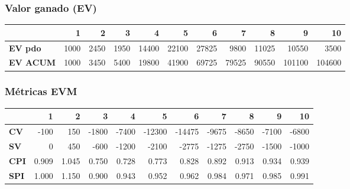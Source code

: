 \subsubsection*{Valor ganado (EV)}
\begin{table}[H]\centering\small
\begin{tabular}{lrrrrrrrrrr}
\toprule
 & \textbf{1} & \textbf{2} & \textbf{3} & \textbf{4} & \textbf{5} & \textbf{6} & \textbf{7} & \textbf{8} & \textbf{9} & \textbf{10} \\
\midrule
\textbf{EV pdo}  & 1000 & 2450 & 1950 & 14400 & 22100 & 27825 & 9800 & 11025 & 10550 & 3500 \\
\textbf{EV ACUM} & 1000 & 3450 & 5400 & 19800 & 41900 & 69725 & 79525 & 90550 & 101100 & 104600 \\
\bottomrule
\end{tabular}
\end{table}

\subsubsection*{Métricas EVM}
\begin{table}[H]\centering\small
\begin{tabular}{lrrrrrrrrrr}
\toprule
 & \textbf{1} & \textbf{2} & \textbf{3} & \textbf{4} & \textbf{5} & \textbf{6} & \textbf{7} & \textbf{8} & \textbf{9} & \textbf{10} \\
\midrule
\textbf{CV}  & -100 & 150 & -1800 & -7400 & -12300 & -14475 & -9675 & -8650 & -7100 & -6800 \\
\textbf{SV}  & 0 & 450 & -600 & -1200 & -2100 & -2775 & -1275 & -2750 & -1500 & -1000 \\
\textbf{CPI} & 0.909 & 1.045 & 0.750 & 0.728 & 0.773 & 0.828 & 0.892 & 0.913 & 0.934 & 0.939 \\
\textbf{SPI} & 1.000 & 1.150 & 0.900 & 0.943 & 0.952 & 0.962 & 0.984 & 0.971 & 0.985 & 0.991 \\
\bottomrule
\end{tabular}
\end{table}

